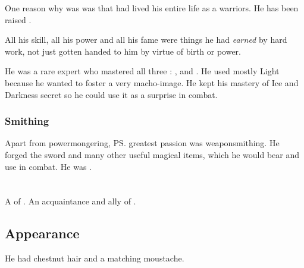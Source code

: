 One reason why \Dasteron{} was  was that \Dasteron{} had lived his entire life as a \Mystraacht{} warriors. 
He has been raised . 

All his skill, all his power and all his fame were things he had \emph{earned} by hard work, not just gotten handed to him by virtue of birth or \sathariah{} power. 

He was a rare expert who mastered all three : 
,  and . 
He used mostly Light because he wanted to foster a very \Mystraacht{} macho-image. 
He kept his mastery of Ice and Darkness secret so he could use it as a surprise in combat. 





\subsubsection{Smithing}
Apart from powermongering, \ps{\Dasteron} greatest passion was weaponsmithing. 
He forged the sword  and many other useful magical items, which he would bear and use in combat. 
He was . 















\section{\Dezruth}
\index{\Dezruth}
A \thelyad{} \resphan{} of \Mystraacht. 
An acquaintance and ally of . 









\subsection{Appearance}
He had chestnut hair and a matching moustache. 















